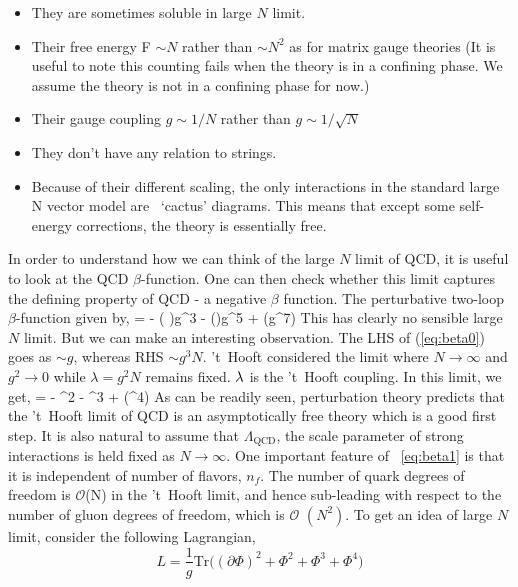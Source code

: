 \begin{itemize}
\item They are sometimes soluble in large $N$ limit. 
\item Their free energy F $\sim N$ rather than $\sim N^2$ as for matrix gauge theories (It is useful to note this 
counting fails when the theory is in a confining phase. We assume the theory is not in a confining phase for now.)
\item Their gauge coupling $g \sim 1/N$ rather than $g \sim 1/\sqrt{N}$
\item They don't have any relation to strings. 
\item Because of their different scaling, the only interactions in the standard large N vector model are ~`cactus' diagrams. 
This means that except some self-energy corrections, the theory is essentially free. 
\end{itemize} 
In order to understand how we can think of the large $N$ limit of QCD, it is useful to look at the QCD $\beta$-function. One can then check whether this limit captures the defining property of QCD - a negative $\beta$ function. The perturbative 
two-loop $\beta$-function given by, 
\beq
\label{eq:beta0}
\mu {} = -  \left ( \right)g^3  -  \left (\right)g^5 + (g^7)
\eeq
This has clearly no sensible large $N$ limit. But we can make an interesting observation. The LHS of (\ref{eq:beta0}) goes as 
$ \sim g$, whereas RHS $ \sim g^3 N$. 't~Hooft considered the limit where $N \to \infty$ and $g^2 \to 0$ while $\lambda = g^2 N $ 
remains fixed. $\lambda$ is the 't~Hooft coupling. In this limit, we get, 
\beq
  \label{eq:beta1}
\mu {} = -  \lambda^2 -   \lam^3 + (\lambda^4) 
\eeq
As can be readily seen, perturbation theory predicts that the 't~Hooft limit of QCD is an asymptotically free
theory which is a good first step. It is also natural to assume that $\Lambda_{\text{QCD}}$, 
the scale parameter of strong interactions is held fixed as $N \to \infty$. One important feature of ~\ref{eq:beta1} 
is that it is independent of number of flavors, $n_{f}$. The 
number of quark degrees of freedom is $\mathscr{O}$(N) in the
't~Hooft limit, and hence sub-leading with respect to the number of gluon degrees of freedom, 
which is $\mathscr{O}$ $(N^{2})$. 
To get an idea of large $N$ limit, consider the following Lagrangian, 
\begin{equation}
L = \frac{1}{g} \mathrm{Tr} \Bigg( (\partial \Phi)^2 + \Phi^2 + \Phi^3 + \Phi^4  \Bigg) 
\end{equation} 
